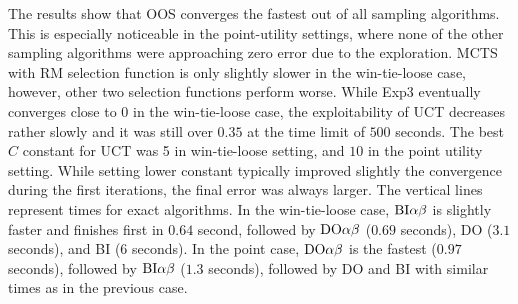 The results show that OOS converges the fastest out of all sampling algorithms.
This is especially noticeable in the point-utility settings, where none of the other sampling algorithms were approaching zero error due to the exploration.
MCTS with RM selection function is only slightly slower in the win-tie-loose case, however, other two selection functions perform worse.
While Exp3 eventually converges close to $0$ in the win-tie-loose case, the exploitability of UCT decreases rather slowly and it was still over $0.35$ at the time limit of $500$ seconds.
The best $C$ constant for UCT was 5 in win-tie-loose setting, and $10$ in the point utility setting.
While setting lower constant typically improved slightly the
convergence during the first iterations, the final error was always larger.
The vertical lines represent times for exact algorithms.
In the win-tie-loose case, $\textrm{BI}\alpha\beta$ is slightly faster and finishes first in $0.64$ second, followed by $\textrm{DO}\alpha\beta$ ($0.69$ seconds), \textsc{DO} ($3.1$ seconds), and \textsc{BI} ($6$ seconds).
In the point case, $\textrm{DO}\alpha\beta$ is the fastest ($0.97$ seconds), followed by $\textrm{BI}\alpha\beta$ ($1.3$ seconds), followed by \textsc{DO} and \textsc{BI} with similar times as in the previous case.

